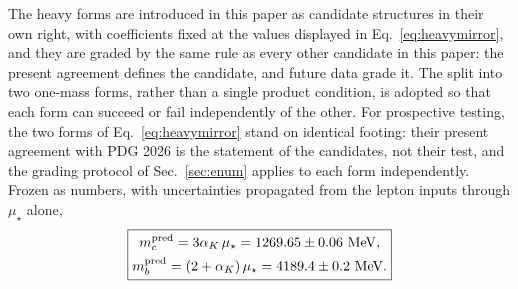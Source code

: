 \documentclass[aps,twocolumn,superscriptaddress,nofootinbib,floatfix]{revtex4-2}
\newcommand{\mstar}{\mu_\star}
\newcommand{\alphaK}{\alpha_K}
\begin{document}
The heavy forms are introduced in this paper as candidate structures in their own right, with coefficients fixed at the values displayed in Eq.~\eqref{eq:heavymirror}, and they are graded by the same rule as every other candidate in this paper: the present agreement defines the candidate, and future data grade it. The split into two one-mass forms, rather than a single product condition, is adopted so that each form can succeed or fail independently of the other. For prospective testing, the two forms of Eq.~\eqref{eq:heavymirror} stand on identical footing: their present agreement with PDG 2026 is the statement of the candidates, not their test, and the grading protocol of Sec.~\ref{sec:enum} applies to each form independently.
Frozen as numbers, with uncertainties propagated from the lepton inputs through $\mstar$ alone,
\begin{equation}
\boxed{\begin{gathered}
m_c^{\rm pred}=3\alphaK\,\mstar=1269.65\pm0.06\ \mathrm{MeV},\\
m_b^{\rm pred}=(2+\alphaK)\,\mstar=4189.4\pm0.2\ \mathrm{MeV}.
\end{gathered}}
\label{eq:frozen}
\end{equation}
\end{document}
